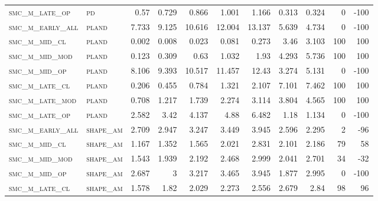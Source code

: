 \begin{landscape}
\begin{center}
\begin{footnotesize}
\begin{longtable}{llrrrrrr|rrr}
\textsc{smc\_m\_late\_op  } & \textsc{pd        }   & 0.57     & 0.729    & 0.866    & 1.001    & 1.166    & 0.313       & 0.324         & 0             & -100     \\
\textsc{smc\_m\_early\_all} & \textsc{pland     }   & 7.733    & 9.125    & 10.616   & 12.004   & 13.137   & 5.639       & 4.734         & 0             & -100     \\
\textsc{smc\_m\_mid\_cl   } & \textsc{pland     }   & 0.002    & 0.008    & 0.023    & 0.081    & 0.273    & 3.46        & 3.103         & 100           & 100      \\
\textsc{smc\_m\_mid\_mod  } & \textsc{pland     }   & 0.123    & 0.309    & 0.63     & 1.032    & 1.93     & 4.293       & 5.736         & 100           & 100      \\
\textsc{smc\_m\_mid\_op   } & \textsc{pland     }   & 8.106    & 9.393    & 10.517   & 11.457   & 12.43    & 3.274       & 5.131         & 0             & -100     \\
\textsc{smc\_m\_late\_cl  } & \textsc{pland     }   & 0.206    & 0.455    & 0.784    & 1.321    & 2.107    & 7.101       & 7.462         & 100           & 100      \\
\textsc{smc\_m\_late\_mod } & \textsc{pland     }   & 0.708    & 1.217    & 1.739    & 2.274    & 3.114    & 3.804       & 4.565         & 100           & 100      \\
\textsc{smc\_m\_late\_op  } & \textsc{pland     }   & 2.582    & 3.42     & 4.137    & 4.88     & 6.482    & 1.18        & 1.134         & 0             & -100     \\
\textsc{smc\_m\_early\_all} & \textsc{shape\_am }   & 2.709    & 2.947    & 3.247    & 3.449    & 3.945    & 2.596       & 2.295         & 2             & -96      \\
\textsc{smc\_m\_mid\_cl   } & \textsc{shape\_am }   & 1.167    & 1.352    & 1.565    & 2.021    & 2.831    & 2.101       & 2.186         & 79            & 58       \\
\textsc{smc\_m\_mid\_mod  } & \textsc{shape\_am }   & 1.543    & 1.939    & 2.192    & 2.468    & 2.999    & 2.041       & 2.701         & 34            & -32      \\
\textsc{smc\_m\_mid\_op   } & \textsc{shape\_am }   & 2.687    & 3        & 3.217    & 3.465    & 3.945    & 1.877       & 2.995         & 0             & -100     \\
\textsc{smc\_m\_late\_cl  } & \textsc{shape\_am }   & 1.578    & 1.82     & 2.029    & 2.273    & 2.556    & 2.679       & 2.84          & 98            & 96       \\

\end{longtable}
\end{footnotesize}
\end{center}
\end{landscape}
